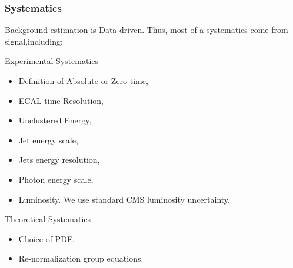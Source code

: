 \documentclass{beamer}
\begin{document}
\begin{frame}
\frametitle{ Systematics}
 \begin{minipage}[t]{0.8\linewidth}
  Background estimation is Data driven.
  Thus, most of a systematics come from signal,including:
  \begin{varblock}[7cm]{Experimental Systematics}
   \begin{itemize}
    \item Definition of Absolute or Zero time,
    \item ECAL time Resolution,    
    \item Unclustered Energy,
    \item Jet energy scale,
    \item Jets energy resolution,
    \item Photon energy scale,
    \item Luminosity. We use standard CMS luminosity uncertainty.
   \end{itemize}
  \end{varblock}  
  \begin{varblock}[7cm]{Theoretical Systematics}
   \begin{itemize}   
   \item Choice of PDF.
   \item Re-normalization group equations.
   \end{itemize}
  \end{varblock} 
\end{minipage}
\end{frame}
\end{document}
